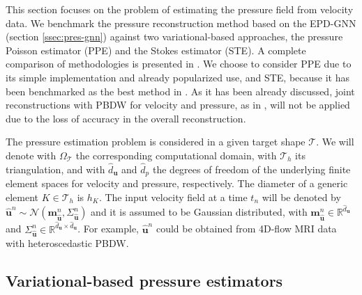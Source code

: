 This section focuses on the problem of estimating the pressure field from velocity data.
We benchmark the pressure reconstruction method based on the EPD-GNN (section \ref{ssec:pres-gnn}) against two variational-based approaches, the pressure Poisson estimator (PPE) and the Stokes estimator (STE).
A complete comparison of methodologies is presented in \cite{bertoglio2018relative}. We choose to consider PPE due to its simple implementation and already popularized use, and STE, because it has been benchmarked as the best method in \cite{bertoglio2018relative}. As it has been already discussed, joint reconstructions with PBDW for velocity and pressure, as in \cite{galarce2023displacement}, will not be applied due to the loss of accuracy in the overall reconstruction.


The pressure estimation problem is considered in a given target shape $\mathcal T$. 
We will denote with $\Omega_{\mathcal T}$ the corresponding computational domain, with $\mathcal{T}_h$ its triangulation, 
and with $\widehat{d}_{\mathbf u}$ and $\widehat{d}_p$ the degrees of freedom of the underlying finite element spaces for velocity and pressure, respectively. The diameter of a generic element $K \in \mathcal T_h$ is $h_K$. 
%
The input velocity field at a time $t_n$ will be denoted by $\widehat{\mathbf u}^n \sim\mathcal{N}(\mathbf m^n_{\widehat{\mathbf u}}, \Sigma^n_{\widehat{\mathbf u}})$ and it is assumed to be Gaussian distributed, 
with $\mathbf m^n_{\widehat{\mathbf u}}\in\mathbb{R}^{\widehat{d}_{\mathbf u}}$ and $\Sigma^n_{\widehat{\mathbf u}}\in\mathbb{R}^{\widehat{d}_{\mathbf u}\times \widehat{d}_{\mathbf u}}$. For example, $\widehat{\mathbf u}^n$ could be obtained from 4D-flow MRI data with heteroscedastic PBDW.

\subsection{Variational-based pressure estimators}
\label{subsec:ppestedef}

